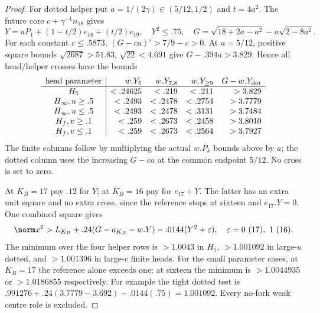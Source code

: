 \begin{proof}
For dotted helper put $a=1/(2\gamma)\in(5/12,1/2)$ and
$t=4a^2$. The future core $c+\gamma^{-1}n_{18}$ gives
\[
 Y=aP_1+(1-t/2)e_{18}+(t/2)e_{19},\quad Y^2\le.75,
 \quad G=\sqrt{18+2a-a^2}-a\sqrt{2-8a^2}.
\]
For each constant $c\le.5873$, $(G-ca)'>7/9-c>0$.
At $a=5/12$, positive square bounds
$\sqrt{2687}>51.83$, $\sqrt{22}<4.691$ give
$G-.394a>3.829$. Hence all head/helper crosses have the bounds
\[
\begin{array}{c|rrrr}
\text{head parameter}&w.Y_5&w.Y_{7,8}&w.Y_{\ge9}&G-w.Y_{\rm dot}\\\hline
H_5&<.24625&<.219&<.211&>3.829\\
H_\infty, u\ge.5&<.2493&<.2478&<.2754&>3.7779\\
H_\infty, u\le.5&<.2493&<.2478&<.3131&>3.7484\\
H_f, v\ge.1&<.259&<.2673&<.2458&>3.8010\\
H_f, v\le.1&<.259&<.2673&<.2564&>3.7927
\end{array}
\]
The finite columns follow by multiplying the actual $w.P_k$
bounds above by $a$; the dotted column uses the increasing
$G-ca$ at the common endpoint $5/12$. No cross is set to zero.

At $K_B=17$ pay $.12$ for $Y$; at $K_B=16$ pay for
$e_{17}+Y$. The latter has an extra unit square and no extra
cross, since the reference stops at sixteen and $e_{17}.Y=0$.
One combined square gives
\begin{equation}\label{app:tail:eq:D20helperpay}
 \norm x^2>L_{K_B}+.24(G-a_{K_B}-w.Y)
                 -.0144(Y^2+\varepsilon),
 \quad\varepsilon=0\ (17),\ 1\ (16).
\end{equation}
The minimum over the four helper rows is $>1.0043$ in $H_5$,
$>1.001092$ in large-$u$ dotted, and $>1.001396$ in large-$v$
finite heads. For the small parameter cases, at $K_B=17$
the reference alone exceeds one; at sixteen the minimum is
$>1.0044935$ or $>1.0186855$ respectively. For example the
tight dotted test is
$.991276+.24(3.7779-3.692)-.0144(.75)=1.001092$.
Every no-fork weak centre role is excluded.


\end{proof}
